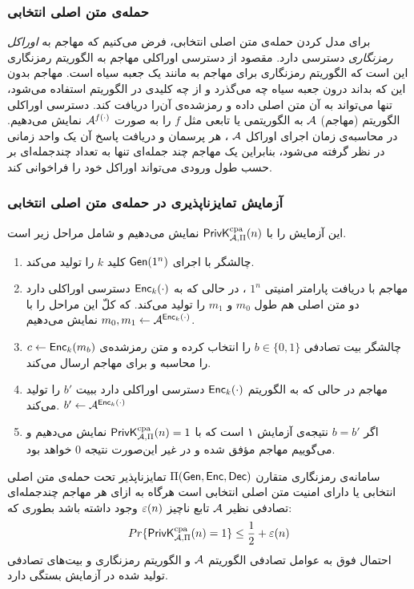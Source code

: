 \subsubsection*{حمله‌ی متن اصلی انتخابی}
برای مدل کردن حمله‌ی متن اصلی انتخابی، فرض می‌کنیم که مهاجم به 
\textit{اوراکل رمزنگاری}
دسترسی دارد. مقصود از دسترسی اوراکلی 
مهاجم به الگوریتم رمزنگاری این است که الگوریتم رمزنگاری  برای مهاجم به مانند یک جعبه سیاه است. مهاجم بدون این که بداند  درون جعبه سیاه چه می‌گذرد و از چه کلیدی در الگوریتم استفاده می‌شود، تنها می‌تواند به آن متن اصلی داده و رمز‌شده‌ی آن‌را دریافت کند. دسترسی اوراکلی الگوریتم (مهاجم) 
$\mathcal{A}$
به الگوریتمی یا تابعی مثل 
$f$
را به صورت 
$\mathcal{A}^{f(\cdot)}$
نمایش می‌دهیم. در محاسبه‌ی زمان اجرای اوراکل 
$\mathcal{A}$
، هر پرسمان و دریافت پاسخ آن یک واحد زمانی در نظر گرفته می‌شود، بنابراین یک مهاجم چند جمله‌ای تنها به تعداد چند‌جمله‌ای بر حسب طول ورودی می‌تواند اوراکل خود را فراخوانی کند. 
\subsubsection*{آزمایش تمایزناپذیری در حمله‌ی متن اصلی انتخابی}
این آزمایش را با 
$\mathsf{PrivK}_{\mathcal{A},\Pi}^{\textup{cpa}}(n)$
نمایش می‌دهیم و شامل مراحل زیر است.
\begin{enumerate}
\item
چالشگر با اجرای 
$\mathsf{Gen}(1^{n})$
 کلید 
 $k$
 را تولید می‌کند.
 \item
 مهاجم با دریافت پارامتر امنیتی 
 $1^{n}$
 ، در حالی که به 
 $\mathsf{Enc}_{k}(\cdot)$
 دسترسی اوراکلی دارد دو متن اصلی هم طول 
 $m_{0}$
 و
 $m_{1}$
 را تولید می‌کند. که کلّ این مراحل را با 
 $m_{0}, m_{1}\leftarrow \mathcal{A}^{\mathsf{Enc}_{k}(\cdot)}$
 نمایش می‌دهیم.
 \item
 چالشگر بیت تصادفی 
 $b\in\{0, 1\}$
 را انتخاب کرده و متن رمزشده‌ی 
 $c\leftarrow \mathsf{Enc}_{k}(m_{b})$
 را محاسبه و برای مهاجم ارسال می‌کند.
 \item
 مهاجم در حالی که به الگوریتم 
 $\mathsf{Enc}_{k}(\cdot)$
  دسترسی اوراکلی دارد ببیت 
  $b'$
  را تولید می‌کند.
  $b'\leftarrow \mathcal{A}^{\mathsf{Enc}_{k}(\cdot)}$
  \item
  اگر
  $b = b'$
  نتیجه‌ی آزمایش ۱ است که با 
  $\mathsf{PrivK}_{\mathcal{A},\Pi}^{\textup{cpa}}(n) = 1$
  نمایش می‌دهیم و می‌گوییم مهاجم مؤفق شده و در غیر این‌صورت نتیجه 
  $0$
  خواهد بود.
\end{enumerate}


\begin{definition}
سامانه‌ی رمزنگاری متقارن 
$\Pi(\mathsf{Gen}, \mathsf{Enc}, \mathsf{Dec})$
تمایزناپذیر تحت حمله‌ی متن اصلی انتخابی یا دارای امنیت متن اصلی انتخابی
است هرگاه به ازای هر مهاجم چندجمله‌ای تصادفی نظیر 
$\mathcal{A}$
 تابع ناچیز 
 $\varepsilon(n)$
وجود داشته باشد بطوری که:
$$Pr\{\mathsf{PrivK}_{\mathcal{A},\Pi}^{\textup{cpa}}(n) = 1\}\leq \frac{1}{2} + \varepsilon(n)$$
احتمال فوق به عوامل تصادفی الگوریتم 
$\mathcal{A}$
و الگوریتم‌ رمزنگاری و بیت‌های تصادفی تولید شده در آزمایش بستگی دارد.

\end{definition}

